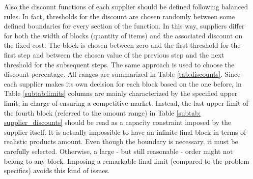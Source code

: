 \documentclass{article}
\begin{document}
Also the discount functions of each supplier should be defined following balanced rules. In fact, thresholds for the discount are chosen randomly between some defined boundaries for every section of the function. In this way, suppliers differ for both the width of blocks (quantity of items) and the associated discount on the fixed cost. The block is chosen between zero and the first threshold for the first step and between the chosen value of the previous step and the next threshold for the subsequent steps. The same approach is used to choose the discount percentage. All ranges are summarized in Table \ref{tab:discounts}.
Since each supplier makes its own decision for each block based on the one before, in Table \ref{subtab:limits} columns are mainly characterized by the specified upper limit, in charge of ensuring a competitive market. Instead, the last upper limit of the fourth block (referred to the amount range) in Table \ref{subtab: supplier_discounts} should be read as a capacity constraint imposed by the supplier itself. It is actually impossible to have an infinite final block in terms of realistic products amount. Even though the boundary is necessary, it must be carefully selected. Otherwise, a large - but still reasonable - order might not belong to any block. Imposing a remarkable final limit (compared to the problem specifics) avoids this kind of issues.
\newline
\end{document}
